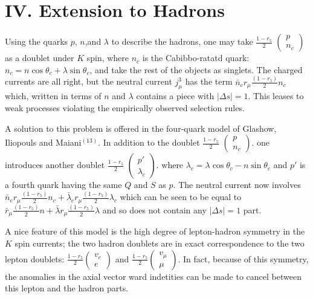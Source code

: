 \section*{IV. Extension to Hadrons}

Using the quarks $p$, $n$,and  $\lambda$ to describe the hadrons, one may take $\frac{1-r_{5}}{2}$ $\begin{pmatrix} p \\ n_{c}\end{pmatrix}$ as a doublet under $K$ spin, where $n_{c}$ is the Cabibbo-ratatd quark: $n_{c}= n \cos \theta_{c} + \lambda \sin \theta_{c}$, and take the rest of the objects as singlets. The charged currents are all right, but the neutral current $j_{\mu}^{3}$ has the term $\bar{n}_{c} r_{\mu}\frac{(1-r_{5})}{2}n_{c}$ which, written in terms of $n$ and $\lambda$ contains a piece with $|\Delta s|=1$. This leases to weak processes violating the empirically observed selection rules.

A solution to this problem is offered in the four-quark model of Glashow, Iliopouls and Maiani$^{(13)}$. In addition to the doublet $\frac{1-r_{5}}{2}$ $\begin{pmatrix} p \\ n_{c}\end{pmatrix}$. one introduces another doublet $\frac{1-r_{5}}{2}$ $\begin{pmatrix} p' \\ \lambda_{c}\end{pmatrix}$. where $\lambda_{c}= \lambda \cos \theta_{c}-n \sin \theta_{c}$ and $p'$ is a fourth quark having the same $Q$ and $S$ as  $p$.  The neutral current now involves $\bar{n}_{e} r_{\mu} \frac{(1-r_{5})}{2} n_{c} + \bar{\lambda}_{c} r_{\mu} \frac{(1-r_{5})}{2} \lambda_{c}$ which can be seen to be equal to $\bar r_{\mu} \frac{(1-r_{5})}{2}n + \bar{\lambda} r_{\mu} \frac{(1-r_{5})}{2}\lambda$ and so does not contain any $|\Delta s | = 1$ part.

A nice feature of this model is the high degree of lepton-hadron symmetry in the $K$ spin currents; the two hadron doublets are in exact correspondence to the two lepton doublets: $\frac{1-r_{5}}{2} \begin{pmatrix} v_{e} \\ e\end{pmatrix} $ and $\frac{1-r_{5}}{2} \begin{pmatrix} v_{\mu} \\ \mu\end{pmatrix} $. In fact, because of this symmetry, the anomalies in the axial vector ward indetities can be made to cancel between this lepton and the hadron parts.

